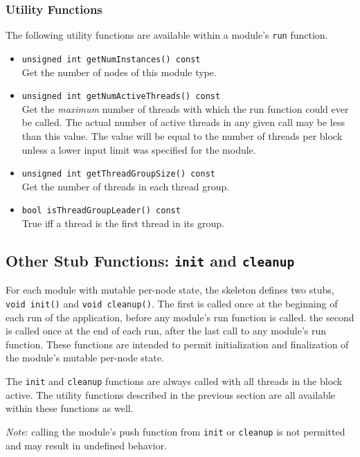\documentclass[11pt]{article}
\begin{document}

\subsubsection{Utility Functions}

The following utility functions are available within a module's
\texttt{run} function.

\begin{itemize}

\item \texttt{unsigned int getNumInstances() const} \\
      Get the number of nodes of this module type.

\item \texttt{unsigned int getNumActiveThreads() const} \\
      Get the \emph{maximum} number of threads with which the run
      function could ever be called.  The actual number of active
      threads in any given call may be less than this value.  The
      value will be equal to the number of threads per block unless
      a lower input limit was specified for the module.

\item \texttt{unsigned int getThreadGroupSize() const} \\
      Get the number of threads in each thread group.

\item \texttt{bool isThreadGroupLeader() const} \\
      True iff a thread is the first thread in its group.

\end{itemize}


\subsection{Other Stub Functions: \texttt{init} and \texttt{cleanup}}

For each module with mutable per-node state, the skeleton defines two
stubs, \texttt{void init()} and \texttt{void cleanup()}.  The first is
called once at the beginning of each run of the application, before
any module's run function is called.  the second is called once at the
end of each run, after the last call to any module's run
function. These functions are intended to permit initialization and
finalization of the module's mutable per-node state.

The \texttt{init} and \texttt{cleanup} functions are always called
with all threads in the block active.  The utility functions
described in the previous section are all available within these
functions as well.

\emph{Note}: calling the module's push function from \texttt{init} or
\texttt{cleanup} is not permitted and may result in undefined
behavior.
\end{document}
